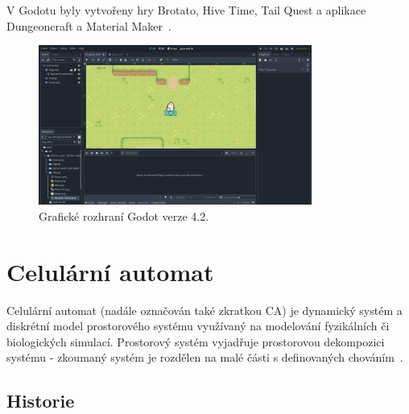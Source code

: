 V Godotu byly vytvořeny hry Brotato, Hive Time, Tail Quest a aplikace Dungeoncraft a Material Maker~\cite{Godot_Engine_Showcase}.
\begin{figure}[H]
	\centering
	\includegraphics[width=0.8\textwidth]{obrazky-figures/ch2/godot_view.png}
	\caption{Grafické rozhraní Godot verze 4.2.}
	\label{godot_view}
\end{figure}

\section{Celulární automat}
Celulární automat (nadále označován také zkratkou CA) je dynamický systém a diskrétní model prostorového systému využívaný na modelování fyzikálních či biologických simulací. Prostorový systém vyjadřuje prostorovou dekompozici systému - zkoumaný systém je rozdělen na malé části s definovaných chováním~\cite{ims}.

\subsection*{Historie}

